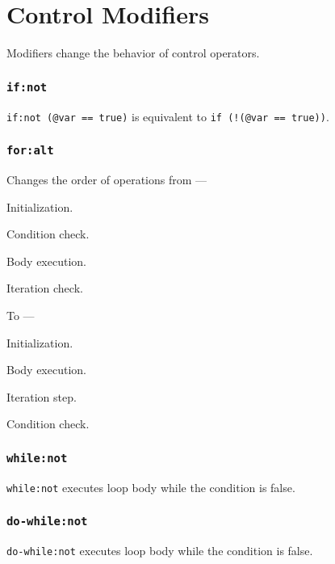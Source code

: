 
\section{Control Modifiers}

\label{sec-modifiers}

Modifiers change the behavior of control operators.

\subsubsection{\texttt{if:not}}

\texttt{if:not (@var == true)} is equivalent to \texttt{if (!(@var == true))}.

\subsubsection{\texttt{for:alt}}

Changes the order of operations from —
\begin{icEnum}
    \item Initialization.
	\item Condition check.
	\item Body execution.
	\item Iteration check.
\end{icEnum}

To —
\begin{icEnum}
    \item Initialization.
	\item Body execution.
	\item Iteration step.
	\item Condition check.
\end{icEnum}

\subsubsection{\texttt{while:not}}

\texttt{while:not} executes loop body while the condition is false.

\subsubsection{\texttt{do-while:not}}

\texttt{do-while:not} executes loop body while the condition is false.

